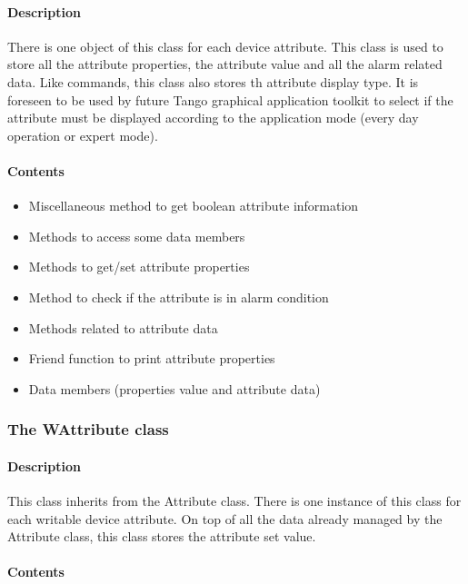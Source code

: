 \paragraph{Description}

There is one object of this class for each device attribute.
This class is used to store all the attribute properties,
the attribute value and all the alarm related data.
Like commands, this class also stores th attribute display type. It
is foreseen to be used by future Tango graphical application toolkit
to select if the attribute must be displayed according to the application
mode (every day operation or expert mode).

\paragraph{Contents}
\begin{itemize}
\item Miscellaneous method to get boolean attribute information
\item Methods to access some data members
\item Methods to get/set attribute properties
\item Method to check if the attribute is in alarm condition
\item Methods related to attribute data
\item Friend function to print attribute properties
\item Data members (properties value and attribute data)
\end{itemize}

\subsubsection{The WAttribute class}

\paragraph{Description}

This class inherits from the Attribute class. There is one instance
of this class for each writable device attribute.
On top of all the data already managed by the Attribute class, this
class stores the attribute set value.

\paragraph{Contents}

